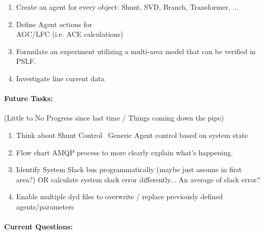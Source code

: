 \documentclass[12pt]{article}
\begin{document}
\begin{multicols}{2}
\begin{enumerate}
		\item Create an agent for every object: Shunt, SVD, Branch, Transformer, ...

		\item Define Agent actions for \\ AGC/LFC (i.e. ACE calculations)

		\item Formulate an experiment utilizing a multi-area model that can be verified in PSLF.

		\item Investigate line current data
		

	\end{enumerate}
\vfill\null
\columnbreak

\paragraph{Future Tasks:}(Little to No Progress since last time / Things coming down the pipe)
	\begin{enumerate}
		\item Think about Shunt Control \ Generic Agent control based on system state

		\item Flow chart AMQP process to more clearly explain what's happening.

		\item Identify System Slack bus programmatically (maybe just assume in first area?)
		\subitem OR calculate system slack error differently... An average of slack error?

		\item Enable multiple dyd files to overwrite / replace previously defined agents/parameters
		
		
	\end{enumerate}
	\paragraph{Current Questions:}
	\begin{enumerate}
		

\end{enumerate}
\end{multicols}
\end{document}
